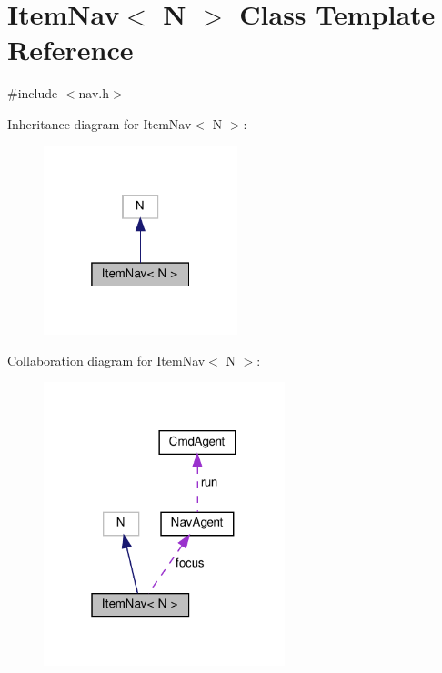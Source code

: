 \hypertarget{classItemNav}{}\section{Item\+Nav$<$ N $>$ Class Template Reference}
\label{classItemNav}


{\ttfamily \#include $<$nav.\+h$>$}



Inheritance diagram for Item\+Nav$<$ N $>$\+:\nopagebreak
\begin{figure}[H]
\begin{center}
\leavevmode
\includegraphics[width=160pt]{classItemNav__inherit__graph}
\end{center}
\end{figure}


Collaboration diagram for Item\+Nav$<$ N $>$\+:\nopagebreak
\begin{figure}[H]
\begin{center}
\leavevmode
\includegraphics[width=199pt]{classItemNav__coll__graph}
\end{center}
\end{figure}
